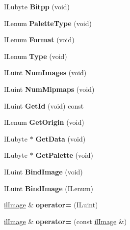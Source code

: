 \begin{DoxyCompactItemize}
\item 
\mbox{\label{classilImage_afa84b63b3df89e3e360a974bef928d35}} 
I\+Lubyte {\bfseries Bitpp} (void)
\item 
\mbox{\label{classilImage_a0166bd9c768205c185dce53fa23e98ea}} 
I\+Lenum {\bfseries Palette\+Type} (void)
\item 
\mbox{\label{classilImage_af4092f81a7c2f543de961516bd290e92}} 
I\+Lenum {\bfseries Format} (void)
\item 
\mbox{\label{classilImage_a0f88daf2f95d135412819ccebe4f087f}} 
I\+Lenum {\bfseries Type} (void)
\item 
\mbox{\label{classilImage_acf420c47cc22431d30df40c18f20029f}} 
I\+Luint {\bfseries Num\+Images} (void)
\item 
\mbox{\label{classilImage_a4b0c1e2439954785a270cdafd8ed7aa6}} 
I\+Luint {\bfseries Num\+Mipmaps} (void)
\item 
\mbox{\label{classilImage_acad3d3521ffd1b77e28c1de331bfb86b}} 
I\+Luint {\bfseries Get\+Id} (void) const
\item 
\mbox{\label{classilImage_a9525278b3752ba48ed4c1493750b6484}} 
I\+Lenum {\bfseries Get\+Origin} (void)
\item 
\mbox{\label{classilImage_afea12e91481d98b4f801bbb44970a31e}} 
I\+Lubyte $\ast$ {\bfseries Get\+Data} (void)
\item 
\mbox{\label{classilImage_a4b5de527399765ca26f0d294e3520720}} 
I\+Lubyte $\ast$ {\bfseries Get\+Palette} (void)
\item 
\mbox{\label{classilImage_a20419985cd158ae99813ee6d9d62dd2d}} 
I\+Luint {\bfseries Bind\+Image} (void)
\item 
\mbox{\label{classilImage_abc9220154ab6bc7f58810dba221a63ef}} 
I\+Luint {\bfseries Bind\+Image} (I\+Lenum)
\item 
\mbox{\label{classilImage_a460cdc6b81aa896adac2cf2166662c3a}} 
\hyperlink{classilImage}{il\+Image} \& {\bfseries operator=} (I\+Luint)
\item 
\mbox{\label{classilImage_a124b7bc379025a1d614db605b250b00a}} 
\hyperlink{classilImage}{il\+Image} \& {\bfseries operator=} (const \hyperlink{classilImage}{il\+Image} \&)
\end{DoxyCompactItemize}
